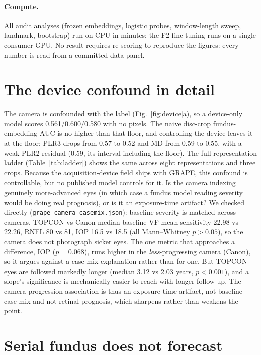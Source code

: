 \paragraph{Compute.} All audit analyses (frozen embeddings, logistic probes, window-length sweep, landmark, bootstrap) run on CPU in
minutes; the F2 fine-tuning runs on a single consumer GPU. No result requires re-scoring to reproduce the figures:
every number is read from a committed data panel.

\section{The device confound in detail}
\label{app:device}

The camera is confounded with the label (Fig.~\ref{fig:device}a), so a device-only model scores
\num{0.561}/\num{0.600}/\num{0.580} with no pixels. The naive disc-crop fundus-embedding AUC is no higher than that
floor, and controlling the device leaves it at the floor: PLR3 drops from \num{0.57} to \num{0.52} and MD from \num{0.59}
to \num{0.55}, with a weak PLR2 residual (\num{0.59}, its interval including the floor). The full representation ladder
(Table~\ref{tab:ladder}) shows the same across eight representations and three crops. Because the acquisition-device field ships with
GRAPE, this confound is controllable, but no published model controls for it. Is the camera indexing genuinely
more-advanced eyes (in which case a fundus model reading severity would be doing real prognosis), or is it an
exposure-time artifact? We checked directly (\texttt{grape\_camera\_casemix.json}): baseline severity is matched across
cameras, TOPCON vs Canon median baseline VF mean sensitivity \num{22.98} vs \num{22.26}, RNFL \num{80} vs \num{81}, IOP
\num{16.5} vs \num{18.5} (all Mann--Whitney $p>0.05$), so the camera does not photograph sicker eyes. The one metric that
approaches a difference, IOP ($p{=}0.068$), runs higher in the \emph{less}-progressing camera (Canon), so it argues
against a case-mix explanation rather than for one. But TOPCON eyes are
followed markedly longer (median \num{3.12} vs \num{2.03} years, $p<0.001$), and a slope's significance is mechanically
easier to reach with longer follow-up. The camera-progression association is thus an exposure-time artifact, not baseline
case-mix and not retinal prognosis, which sharpens rather than weakens the point.

\section{Serial fundus does not forecast}
\label{app:serial}


